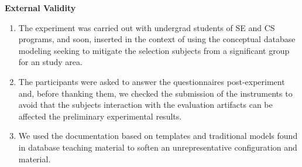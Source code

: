 \textbf{External Validity}
\begin{enumerate}[label=\roman*]
    \item The experiment was carried out with undergrad students of SE and CS programs, and soon, inserted in the context of using the conceptual database modeling seeking to mitigate the selection subjects from a significant group for an study area. 
    \item The participants were asked to answer the questionnaires post-experiment and, before thanking them, we checked the submission of the instruments to avoid that the subjects interaction with the evaluation artifacts can be affected the preliminary experimental results.
    \item We used the documentation based on templates and traditional models found in database teaching material to soften an unrepresentative configuration and material.
\end{enumerate}

